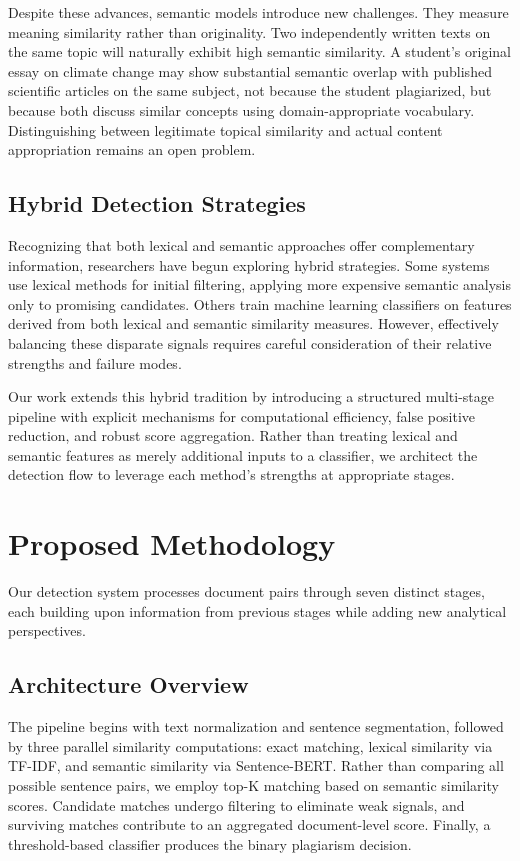 \documentclass[conference]{IEEEtran}
\begin{document}
Despite these advances, semantic models introduce new challenges. They measure meaning similarity rather than originality. Two independently written texts on the same topic will naturally exhibit high semantic similarity. A student's original essay on climate change may show substantial semantic overlap with published scientific articles on the same subject, not because the student plagiarized, but because both discuss similar concepts using domain-appropriate vocabulary. Distinguishing between legitimate topical similarity and actual content appropriation remains an open problem.

\subsection{Hybrid Detection Strategies}

Recognizing that both lexical and semantic approaches offer complementary information, researchers have begun exploring hybrid strategies. Some systems use lexical methods for initial filtering, applying more expensive semantic analysis only to promising candidates. Others train machine learning classifiers on features derived from both lexical and semantic similarity measures. However, effectively balancing these disparate signals requires careful consideration of their relative strengths and failure modes.

Our work extends this hybrid tradition by introducing a structured multi-stage pipeline with explicit mechanisms for computational efficiency, false positive reduction, and robust score aggregation. Rather than treating lexical and semantic features as merely additional inputs to a classifier, we architect the detection flow to leverage each method's strengths at appropriate stages.

\section{Proposed Methodology}

Our detection system processes document pairs through seven distinct stages, each building upon information from previous stages while adding new analytical perspectives.

\subsection{Architecture Overview}

The pipeline begins with text normalization and sentence segmentation, followed by three parallel similarity computations: exact matching, lexical similarity via TF-IDF, and semantic similarity via Sentence-BERT. Rather than comparing all possible sentence pairs, we employ top-K matching based on semantic similarity scores. Candidate matches undergo filtering to eliminate weak signals, and surviving matches contribute to an aggregated document-level score. Finally, a threshold-based classifier produces the binary plagiarism decision.
\end{document}
